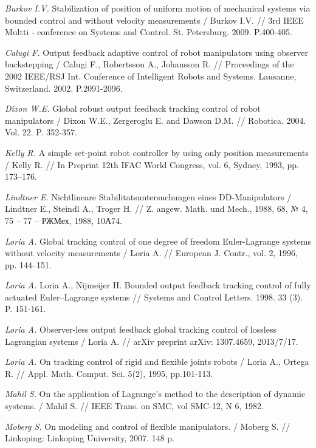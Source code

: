 \begin{thebibliography}{10}
	{\it Burkov I.V.} Stabilization of position of uniform motion of mechanical systems via bounded
	control and without velocity measurements / Burkov I.V. // 3rd IEEE Multti - conference on Systems and Control.
	St. Petersburg. 2009. P.400-405.
	
	{\it Calugi F.} Output feedback adaptive control of robot manipulators using observer backstepping / Calugi F., Robertsson A., Johansson R. // 		Proceedings of the 2002 IEEE/RSJ Int. Conference of Intelligent Robots and Systems. Lausanne, Switzerland. 2002. P.2091-2096.
	
	{\it Dixon W.E.} Global robust output feedback tracking control of robot manipulators / Dixon W.E., Zergeroglu E. and Dawson D.M. // Robotica. 		2004. Vol. 22. P. 352-357.
	
	{\it Kelly R.} A simple set-point robot controller by using only position measurements / Kelly R. // In Preprint 12th IFAC World Congress, vol. 	6, Sydney, 1993, pp. 173–176.
	
	{\it Lindtner E.} Nichtlineare Stabilitatsuntersuchungen eines DD-Manipulators / Lindtner E., Steindl A., Troger H. // Z. angew. Math. und Mech., 	1988, 68, № 4, 75 – 77 – РЖМех, 1988, 10А74.
	
	{\it Loria A.} Global tracking control of one degree of freedom Euler-Lagrange systems without velocity measurements / Loria A. // European J. 		Contr., vol. 2, 1996, pp. 144–151.
	
	{\it Loria A.} Loria A., Nijmeijer H. Bounded output feedback tracking control of fully actuated Euler–Lagrange systems // Systems and Control 		Letters. 1998. 33 (3). P. 151-161.

	{\it Loria A.} Observer-less output feedback global tracking control of lossless Lagrangian systems / Loria A. // arXiv preprint arXiv:			1307.4659, 2013/7/17.

	{\it Loria A.} On tracking control of rigid and flexible joints robots / Loria A., Ortega R. // Appl. Math. Comput. Sci. 5(2), 1995, pp.101-113.
	
	{\it Mahil S.} On the application of Lagrange's method to the description of dynamic systems. / Mahil S. // IEEE Trans. on SMC, vol SMC-12, N 6, 		1982.
	
	{\it Moberg S.} On modeling and control of flexible manipulators. / Moberg S. // Linkoping: Linkoping University,
	2007. 148 p.
	

\end{thebibliography}
